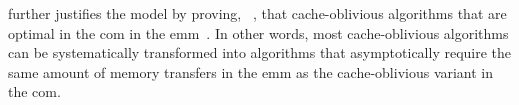 %
%
%
%
\citeauthor{coa-thesis} further justifies the model by proving, ~\cite[12]{coa-thesis}, that cache-oblivious algorithms that are optimal in
the \gls{com}  in the \gls{emm}~\cite[theorem 32, \pno~56]{coa-thesis}.  In other words, most
cache-oblivious algorithms can be systematically transformed into  algorithms that asymptotically require the same amount of memory transfers in
the \gls{emm} as the cache-oblivious variant in the \gls{com}.



%
%
